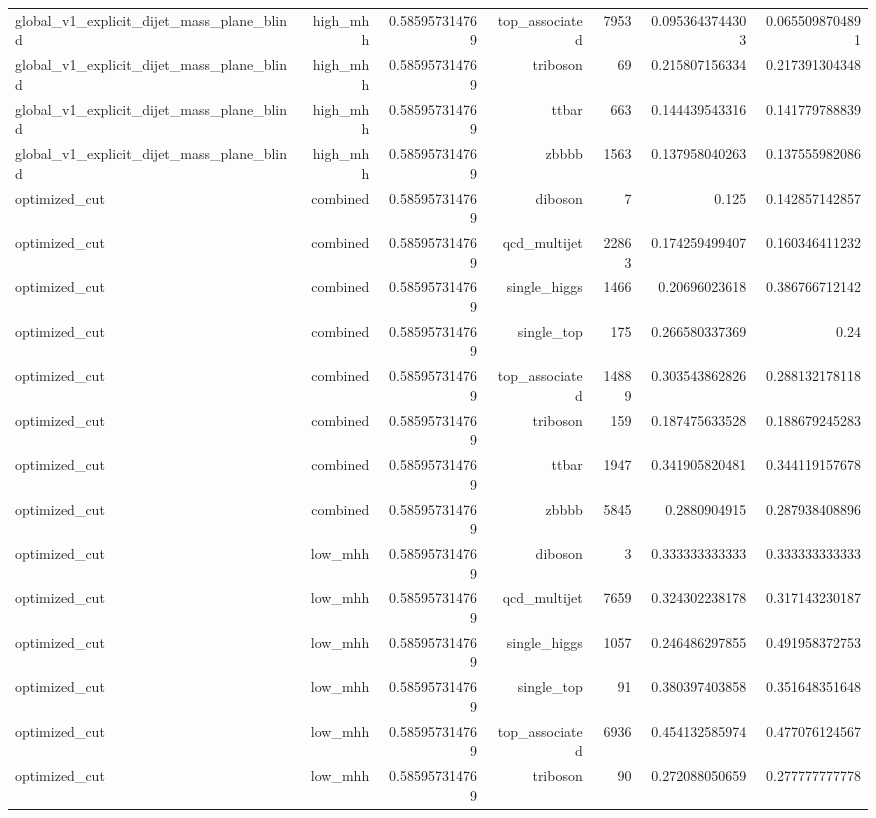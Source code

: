 \begin{table}[htbp]
{\begin{tabular}{lrrrrrr}
global\_v1\_explicit\_dijet\_mass\_plane\_blind & high\_mhh & 0.585957314769 & top\_associated & 7953 & 0.0953643744303 & 0.0655098704891 \\
global\_v1\_explicit\_dijet\_mass\_plane\_blind & high\_mhh & 0.585957314769 & triboson & 69 & 0.215807156334 & 0.217391304348 \\
global\_v1\_explicit\_dijet\_mass\_plane\_blind & high\_mhh & 0.585957314769 & ttbar & 663 & 0.144439543316 & 0.141779788839 \\
global\_v1\_explicit\_dijet\_mass\_plane\_blind & high\_mhh & 0.585957314769 & zbbbb & 1563 & 0.137958040263 & 0.137555982086 \\
optimized\_cut & combined & 0.585957314769 & diboson & 7 & 0.125 & 0.142857142857 \\
optimized\_cut & combined & 0.585957314769 & qcd\_multijet & 22863 & 0.174259499407 & 0.160346411232 \\
optimized\_cut & combined & 0.585957314769 & single\_higgs & 1466 & 0.20696023618 & 0.386766712142 \\
optimized\_cut & combined & 0.585957314769 & single\_top & 175 & 0.266580337369 & 0.24 \\
optimized\_cut & combined & 0.585957314769 & top\_associated & 14889 & 0.303543862826 & 0.288132178118 \\
optimized\_cut & combined & 0.585957314769 & triboson & 159 & 0.187475633528 & 0.188679245283 \\
optimized\_cut & combined & 0.585957314769 & ttbar & 1947 & 0.341905820481 & 0.344119157678 \\
optimized\_cut & combined & 0.585957314769 & zbbbb & 5845 & 0.2880904915 & 0.287938408896 \\
optimized\_cut & low\_mhh & 0.585957314769 & diboson & 3 & 0.333333333333 & 0.333333333333 \\
optimized\_cut & low\_mhh & 0.585957314769 & qcd\_multijet & 7659 & 0.324302238178 & 0.317143230187 \\
optimized\_cut & low\_mhh & 0.585957314769 & single\_higgs & 1057 & 0.246486297855 & 0.491958372753 \\
optimized\_cut & low\_mhh & 0.585957314769 & single\_top & 91 & 0.380397403858 & 0.351648351648 \\
optimized\_cut & low\_mhh & 0.585957314769 & top\_associated & 6936 & 0.454132585974 & 0.477076124567 \\
optimized\_cut & low\_mhh & 0.585957314769 & triboson & 90 & 0.272088050659 & 0.277777777778 \\

\end{tabular}}
\end{table}
